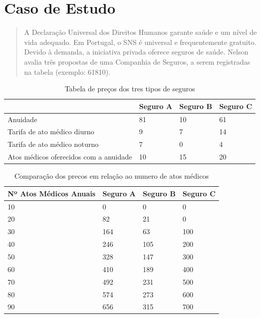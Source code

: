 \documentclass[10pt,a4paper]{article}
\begin{document}
\section{Caso de Estudo}
\begin{quote}
A Declaração Universal dos Direitos Humanos garante saúde e um nível de vida adequado. Em Portugal, o SNS é universal e frequentemente gratuito. Devido à demanda, a iniciativa privada oferece seguros de saúde. Nelson avalia três propostas de uma Companhia de Seguros, a serem registradas na tabela (exemplo: 61810).
\end{quote}

\begin{table}[!ht]
    \centering
    \begin{tabular}{|l|l|l|l|}
    \hline
        ~ & Seguro A & Seguro B & Seguro C \\ \hline
        Anuidade & 81 & 10 & 61 \\ \hline
        Tarifa de ato médico diurno & 9 & 7 & 14\\ \hline
        Tarifa de ato médico noturno & 7 & 0 & 4  \\ \hline
        Atos médicos oferecidos com a anuidade & 10 & 15 & 20 \\ \hline

    \end{tabular}
	\caption{Tabela de preços dos tres tipos de seguros}
	
\end{table}


\begin{table}[!ht]
    \centering
    \begin{tabular}{|l|l|l|l|}
    \hline
        Nº Atos Médicos Anuais & Seguro A & Seguro B & Seguro C \\ \hline
        10 & 0 & 0 & 0\\ \hline
        20 & 82 & 21 & 0  \\ \hline
        30 & 164 & 63 & 100  \\ \hline
        40 & 246 & 105 & 200 \\ \hline
        50 & 328 & 147 & 300 \\ \hline
        60 & 410 & 189 & 400  \\ \hline
        70 & 492 & 231 & 500 \\ \hline
        80 & 574 & 273 & 600 \\ \hline
        90 & 656 & 315 & 700  \\ \hline
    \end{tabular}
	\caption{Comparação dos precos em relação ao numero de atos médicos}
\end{table}
\end{document}
